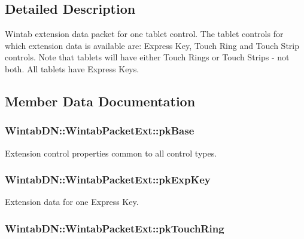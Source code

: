 \subsection{Detailed Description}
Wintab extension data packet for one tablet control. The tablet controls for which extension data is available are: Express Key, Touch Ring and Touch Strip controls. Note that tablets will have either Touch Rings or Touch Strips -\/ not both. All tablets have Express Keys. 

\subsection{Member Data Documentation}
\hypertarget{struct_wintab_d_n_1_1_wintab_packet_ext_a8994260741db2010095537bd4326e9aa}{
\subsubsection[{pkBase}]{ {\bf WintabDN::WintabPacketExt::pkBase}}}
\label{struct_wintab_d_n_1_1_wintab_packet_ext_a8994260741db2010095537bd4326e9aa}


Extension control properties common to all control types. 

\hypertarget{struct_wintab_d_n_1_1_wintab_packet_ext_aedaaaf53b6fec81efc083188010e2a9b}{
\subsubsection[{pkExpKey}]{ {\bf WintabDN::WintabPacketExt::pkExpKey}}}
\label{struct_wintab_d_n_1_1_wintab_packet_ext_aedaaaf53b6fec81efc083188010e2a9b}


Extension data for one Express Key. 

\hypertarget{struct_wintab_d_n_1_1_wintab_packet_ext_ad0e35127b3d018e8e430644b086a0e68}{
\subsubsection[{pkTouchRing}]{ {\bf WintabDN::WintabPacketExt::pkTouchRing}}}
\label{struct_wintab_d_n_1_1_wintab_packet_ext_ad0e35127b3d018e8e430644b086a0e68}


